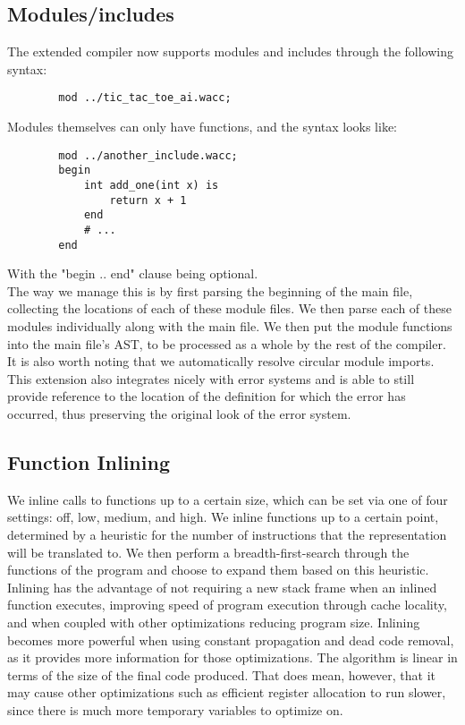 \documentclass{article}
\begin{document}
        \subsection*{Modules/includes}
        The extended compiler now supports modules and includes through the following syntax:
        \begin{verbatim}
        mod ../tic_tac_toe_ai.wacc;
        \end{verbatim}
        Modules themselves can only have functions, and the syntax looks like:
        \begin{verbatim}
        mod ../another_include.wacc;
        begin
            int add_one(int x) is
                return x + 1
            end
            # ...
        end
        \end{verbatim}
        With the "begin .. end" clause being optional.
        \\ The way we manage this is by first parsing the beginning of the main file, collecting the locations of each of these module files. We then parse each of these modules individually along with the main file. We then put the module functions into the main file's AST, to be processed as a whole by the rest of the compiler. It is also worth noting that we automatically resolve circular module imports.
        \\ This extension also integrates nicely with error systems and is able to still provide reference to the location of the definition for which the error has occurred, thus preserving the original look of the error system.
        
        \subsection*{Function Inlining}
        We inline calls to functions up to a certain size, which can be set via one of four settings: off, low, medium, and high. We inline functions up to a certain point, determined by a heuristic for the number of instructions that the representation will be translated to. We then perform a breadth-first-search through the functions of the program and choose to expand them based on this heuristic. Inlining has the advantage of not requiring a new stack frame when an inlined function executes, improving speed of program execution through cache locality, and when coupled with other optimizations reducing program size. Inlining becomes more powerful when using constant propagation and dead code removal, as it provides more information for those optimizations. The algorithm is linear in terms of the size of the final code produced. That does mean, however, that it may cause other optimizations such as efficient register allocation to run slower, since there is much more temporary variables to optimize on.
        
\end{document}

